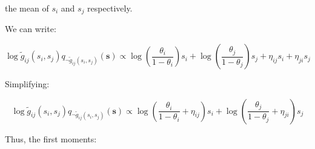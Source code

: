 \documentclass[12pt]{article}
\newcommand\tab[1][1cm]{\hspace*{#1}}
\begin{document}
the mean of $s_i$ and $s_j$ respectively.

We can write:

\[\log \tilde{g}_{ij}(s_i, s_j) q_{\neg \tilde{g}_{ij}(s_i, s_j)}(\textbf{s}) \propto \log \left(\frac{\theta_i}{1-\theta_i} \right) s_i + \log \left(\frac{\theta_j}{1-\theta_j} \right) s_j + \eta_{ij} s_i + \eta_{ji} s_j\]

Simplifying:

\[\log \tilde{g}_{ij}(s_i, s_j) q_{\neg \tilde{g}_{ij}(s_i, s_j)}(\textbf{s}) \propto \log \left(\frac{\theta_i}{1-\theta_i} + \eta_{ij} \right) s_i + \log \left(\frac{\theta_j}{1-\theta_j} + \eta_{ji} \right) s_j \]


%


Thus, the first moments:
\end{document}
